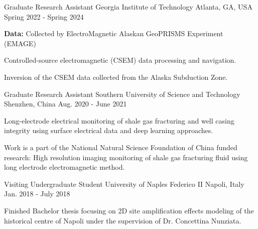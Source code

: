 

\begin{cventries}

  \cventry
    {Graduate Research Assistant} %
    {Georgia Institute of Technology} %
    {Atlanta, GA, USA} %
    {Spring 2022 - Spring 2024} %
    {
      \begin{cvitems}
        \item {\textbf{Data:} Collected by ElectroMagnetic Alaskan GeoPRISMS Experiment (EMAGE)}
        \item {Controlled-source electromagnetic (CSEM) data processing and navigation.}
        \item {Inversion of the CSEM data collected from the Alaska Subduction Zone.}
      \end{cvitems}
    }

  \cventry
    {Graduate Research Assistant} %
    {Southern University of Science and Technology} %
    {Shenzhen, China} %
    {Aug. 2020 - June 2021} %
    {
      \begin{cvitems} %
        \item {Long-electrode electrical monitoring of shale gas fracturing and well casing integrity using surface electrical data and deep learning approaches.}
        \item {Work is a part of the National Natural Science Foundation of China funded research: High resolution imaging monitoring of shale gas fracturing fluid using long electrode electromagnetic method.}
      \end{cvitems}
    }

  \cventry
    {Visiting Undergraduate Student} %
    {University of Naples Federico II} %
    {Napoli, Italy} %
    {Jan. 2018 - July 2018} %
    {
      \begin{cvitems} %
        \item {Finished Bachelor thesis focusing on 2D site amplification effects modeling of the historical centre of Napoli under the supervision of Dr. Concettina Nunziata.}
      \end{cvitems}
    }

\end{cventries}
